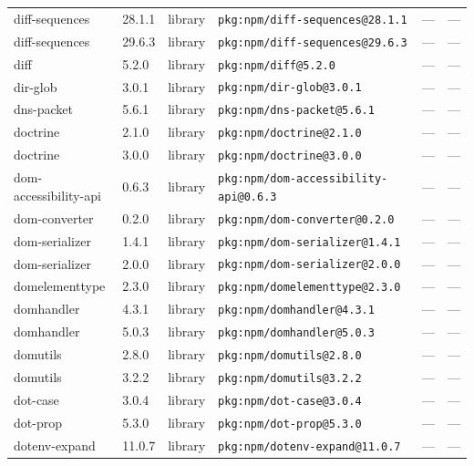 \documentclass[11pt,a4paper]{article}
\begin{document}
\begin{longtable}{|p{4cm}|p{2cm}|p{1.6cm}|p{5cm}|p{1.5cm}|p{3.5cm}|}
\raggedright diff-sequences & 28.1.1 & library & \small\texttt{pkg:npm/diff-sequences@28.1.1} & — & \small — \\
\raggedright diff-sequences & 29.6.3 & library & \small\texttt{pkg:npm/diff-sequences@29.6.3} & — & \small — \\
\raggedright diff & 5.2.0 & library & \small\texttt{pkg:npm/diff@5.2.0} & — & \small — \\
\raggedright dir-glob & 3.0.1 & library & \small\texttt{pkg:npm/dir-glob@3.0.1} & — & \small — \\
\raggedright dns-packet & 5.6.1 & library & \small\texttt{pkg:npm/dns-packet@5.6.1} & — & \small — \\
\raggedright doctrine & 2.1.0 & library & \small\texttt{pkg:npm/doctrine@2.1.0} & — & \small — \\
\raggedright doctrine & 3.0.0 & library & \small\texttt{pkg:npm/doctrine@3.0.0} & — & \small — \\
\raggedright dom-accessibility-api & 0.6.3 & library & \small\texttt{pkg:npm/dom-accessibility-api@0.6.3} & — & \small — \\
\raggedright dom-converter & 0.2.0 & library & \small\texttt{pkg:npm/dom-converter@0.2.0} & — & \small — \\
\raggedright dom-serializer & 1.4.1 & library & \small\texttt{pkg:npm/dom-serializer@1.4.1} & — & \small — \\
\raggedright dom-serializer & 2.0.0 & library & \small\texttt{pkg:npm/dom-serializer@2.0.0} & — & \small — \\
\raggedright domelementtype & 2.3.0 & library & \small\texttt{pkg:npm/domelementtype@2.3.0} & — & \small — \\
\raggedright domhandler & 4.3.1 & library & \small\texttt{pkg:npm/domhandler@4.3.1} & — & \small — \\
\raggedright domhandler & 5.0.3 & library & \small\texttt{pkg:npm/domhandler@5.0.3} & — & \small — \\
\raggedright domutils & 2.8.0 & library & \small\texttt{pkg:npm/domutils@2.8.0} & — & \small — \\
\raggedright domutils & 3.2.2 & library & \small\texttt{pkg:npm/domutils@3.2.2} & — & \small — \\
\raggedright dot-case & 3.0.4 & library & \small\texttt{pkg:npm/dot-case@3.0.4} & — & \small — \\
\raggedright dot-prop & 5.3.0 & library & \small\texttt{pkg:npm/dot-prop@5.3.0} & — & \small — \\
\raggedright dotenv-expand & 11.0.7 & library & \small\texttt{pkg:npm/dotenv-expand@11.0.7} & — & \small — \\

\end{longtable}
\end{document}
